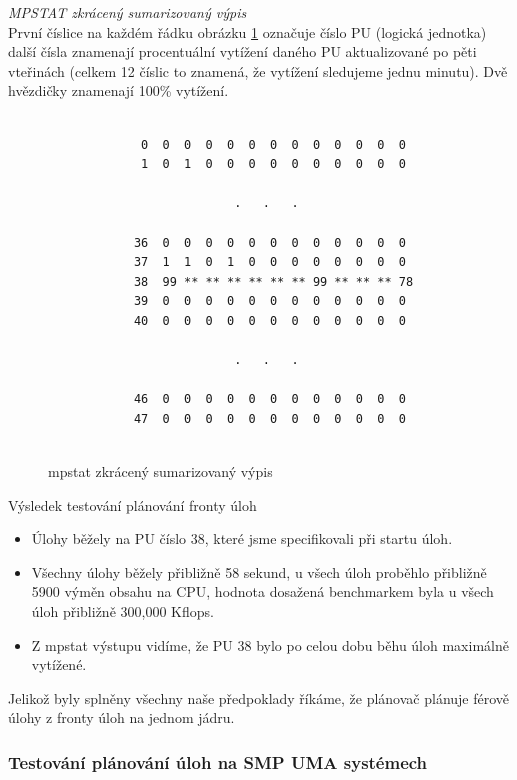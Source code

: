 \documentclass[
  master=true,
  font=sans,
  printversion=false,
  joinlists=true,
  figures=true,
  tables=true,
  sourcecodes=false,
  theorems=false,
  bibencoding=utf8,
  language=czech,
  encoding=utf8,
  field=ainfk,
  biblatex,
  glossaries,
  index
]{kidiplom}
\begin{document}
\newpage
\noindent
\textit{MPSTAT zkrácený sumarizovaný výpis} \\ 

První číslice na každém řádku obrázku \ref{mpstat1} označuje číslo PU (logická jednotka) další čísla znamenají procentuální vytížení daného PU aktualizované po pěti vteřinách (celkem 12 číslic to znamená, že vytížení sledujeme jednu minutu). Dvě hvězdičky znamenají 100\% vytížení. 

\begin{figure}[ht]
\caption{mpstat zkrácený sumarizovaný výpis}
\center
\label{mpstat1}

\begin{Verbatim}[frame=single]

             0  0  0  0  0  0  0  0  0  0  0  0  0
             1  0  1  0  0  0  0  0  0  0  0  0  0
            
                          .   .   .
           
            36  0  0  0  0  0  0  0  0  0  0  0  0
            37  1  1  0  1  0  0  0  0  0  0  0  0
            38  99 ** ** ** ** ** ** 99 ** ** ** 78
            39  0  0  0  0  0  0  0  0  0  0  0  0
            40  0  0  0  0  0  0  0  0  0  0  0  0
           
                          .   .   .
           
            46  0  0  0  0  0  0  0  0  0  0  0  0
            47  0  0  0  0  0  0  0  0  0  0  0  0
           
\end{Verbatim}
\end{figure}

\noindent
Výsledek testování plánování fronty úloh
\begin{itemize}
\item Úlohy běžely na PU číslo 38, které jsme specifikovali při startu úloh.
\item Všechny úlohy běžely přibližně 58 sekund, u všech úloh proběhlo přibližně 5900 výměn obsahu na CPU, hodnota dosažená benchmarkem byla u všech úloh přibližně 300,000 Kflops.
\item Z mpstat výstupu vidíme, že PU 38 bylo po celou dobu běhu úloh maximálně vytížené.
\end{itemize}

Jelikož byly splněny všechny naše předpoklady říkáme, že plánovač plánuje férově úlohy z fronty úloh na jednom jádru.

\subsubsection{Testování plánování úloh na SMP UMA systémech}
\end{document}
